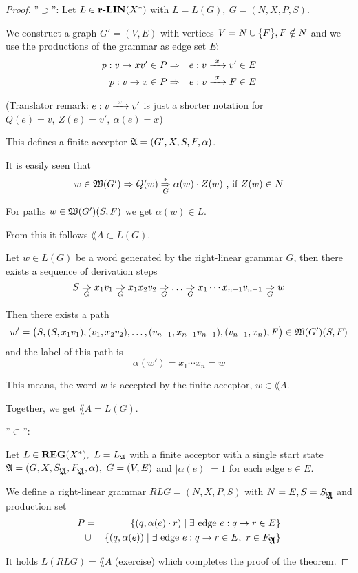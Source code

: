 \begin{proof}
''$\supset$'': Let $L \in \mbox{{\bf r-LIN}}(X^*)$ with $L = L(G),\ G = (N, X, P, S)$.

We construct a graph $G' = (V, E)$ with vertices $V = N \cup \mbox{$\{F\}$}, F
\notin N$ and we use the productions of the grammar as edge set $E$:
\begin{eqnarray*}
p: v \to x v' \in P & \Rightarrow & e:  v \xrightarrow{\ {x}\ } v' \in E \\
p: v \to x \in P & \Rightarrow & e : v \xrightarrow{\ {x}\ } F \in E
\end{eqnarray*} 

(Translator remark: $e: v \xrightarrow{\ {x}\ } v'$ is just a shorter notation for $Q(e) =
v, \ Z(e) = v',\ \alpha(e) = x$)

This defines a finite acceptor $\mbox{$\mathfrak{A}$} = (G', X, S, F, \alpha)$.

It is easily seen that
\[ w \in \mbox{$\mathfrak{W}({G'})$} \Rightarrow Q(w) \underset{{G}}{\overset{*}{\Rightarrow}} \alpha(w) \cdot Z(w) \mbox{
 , if } Z(w) \in N\]

For paths $w \in \mbox{$\mathfrak{W}({G'})$}(S, F)$ we get $\alpha(w) \in L$.

From this it follows $\lang{A} \subset L(G)$.

Let $w \in L(G)$ be a word generated by the right-linear grammar $G$, then there
exists a sequence of derivation steps
\[ S \underset{G}{\Rightarrow} x_1 v_1 \underset{G}{\Rightarrow} x_1 x_2 v_2 \underset{G}{\Rightarrow} \ldots
\underset{G}{\Rightarrow} x_1 \cdots x_{n-1} v_{n-1} \underset{G}{\Rightarrow} w \]

Then there exists a path 
\[ w' = \big(S, (S,x_1 v_1), (v_1, x_2 v_2), \ldots, (v_{n-1}, x_{n-1} v_{n-1}),
(v_{n-1}, x_n), F\big) \in \mbox{$\mathfrak{W}({G'})$}(S, F) \]
and the label of this path is
\[ \alpha(w') = x_1 \cdots x_n = w \]

This means, the word $w$ is accepted by the finite acceptor, $w \in \lang{A}$.

Together, we get $\lang{A} = L(G)$.

''$\subset$'':

Let $L \in \mbox{{\bf REG}}(X^*),\ L = \mbox{$L_{\mathfrak{A}}$}$ with a finite acceptor with a single start
state $\mbox{$\mathfrak{A}$} = (G, X, S_{\mbox{$\mathfrak{A}$}}, F_{\mbox{$\mathfrak{A}$}}, \alpha),\ G = (V, E)$ 
and $|\alpha(e)| = 1$ for each edge $e \in E$.

We define a right-linear grammar $RLG = (N, X, P, S)$ with $N = E, S =
S_{\mbox{$\mathfrak{A}$}}$ and production set
\begin{eqnarray*}
P & = & \mbox{$\{(q, \alpha(e) \cdot r) \mid \exists \mbox{ edge } e : q \to r \in
E\}$} \\
& \cup & \mbox{$\{(q, \alpha(e)) \mid \exists \mbox{ edge } e : q \to r \in E,\ r
\in F_{\mbox{$\mathfrak{A}$}}\}$}
\end{eqnarray*}

It holds $L(RLG) = \lang{A}$ (exercise) which completes the proof of the
theorem.
\end{proof}

